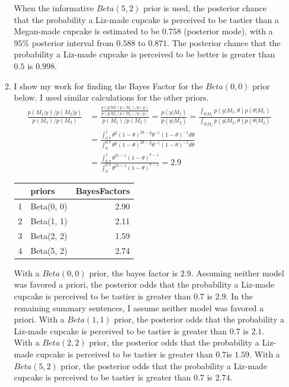 \documentclass[12pt]{article}\usepackage[]{graphicx}\usepackage[]{color}
\newenvironment{knitrout}{}{} %
\begin{document}
\begin{doublespacing}
\begin{enumerate}
\begin{enumerate}
\begin{knitrout}
\end{knitrout}

When the informative $Beta(5, 2)$ prior is used, the posterior chance that the probability a Liz-made cupcake is perceived to be tastier than a Megan-made cupcake is estimated to be $0.758$ (posterior mode), with a $95\%$ posterior interval from $0.588$ to $0.871$. The posterior chance that the probability a Liz-made cupcake is perceived to be better is greater than $0.5$ is $0.998$. 

\item I show my work for finding the Bayes Factor for the $Beta(0, 0)$ prior below. I used similar calculations for the other priors.
\begin{align*}
\frac{p(M_1|y)/p(M_2|y)}{p(M_1)/p(M_2)} &= \frac{\frac{p(y|M1)p(M_1)/p(y)}{p(y|M_2)p(M_2)/p(y)}}{p(M_1)/p(M_2)} = \frac{p(y|M_1)}{p(y|M_2)} = \frac{\int_{\theta|M_1} p(y|M_1, \theta) p(\theta|M_1)}{\int_{\theta|M_2} p(y|M_2, \theta) p(\theta|M_2)} \\
&= \frac{\int_{0.7}^{1} \theta^y(1-\theta)^{28-y}\theta^{-1}(1-\theta)^{-1}d\theta}{\int_{0}^{0.7} \theta^y(1-\theta)^{28-y}\theta^{-1}(1-\theta)^{-1}d\theta} \\
&= \frac{\int_{0.7}^{1} \theta^{21-1}(1-\theta)^{7-1}}{\int_{0}^{0.7} \theta^{21-1}(1-\theta)^{7-1}} = 2.9
\end{align*}

\begin{table}[ht]
\centering
\begin{tabular}{rlr}
  \hline
 & priors & BayesFactors \\ 
  \hline
1 & Beta(0, 0) & 2.90 \\ 
  2 & Beta(1, 1) & 2.11 \\ 
  3 & Beta(2, 2) & 1.59 \\ 
  4 & Beta(5, 2) & 2.74 \\ 
   \hline
\end{tabular}
\end{table}


With a $Beta(0, 0)$ prior, the bayes factor is $2.9$. Assuming neither model was favored a priori, the posterior odds that the probability a Liz-made cupcake is perceived to be tastier is greater than $0.7$ is $2.9$. In the remaining summary sentences, I assume neither model was favored a priori. With a $Beta(1, 1)$ prior, the posterior odds that the probability a Liz-made cupcake is perceived to be tastier is greater than $0.7$ is $2.1$. With a $Beta(2, 2)$ prior, the posterior odds that the probability a Liz-made cupcake is perceived to be tastier is greater than $0.7$is $1.59$. With a $Beta(5, 2)$ prior, the posterior odds that the probability a Liz-made cupcake is perceived to be tastier is greater than $0.7$ is $2.74$.


\end{enumerate}
\end{enumerate}
\end{doublespacing}
\end{document}
